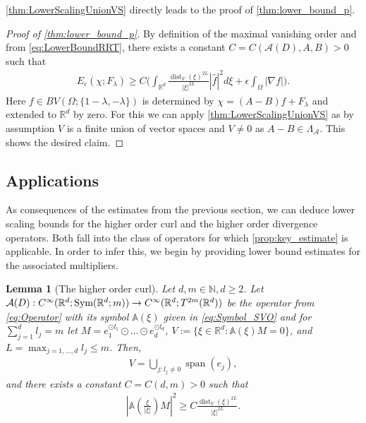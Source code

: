 \documentclass[a4paper, 10pt, twoside, notitlepage]{amsart}
\theoremstyle{plain}
\newtheorem{lem}[prop]{Lemma}
\newcommand{\R}{\mathbb{R}}
\newcommand{\N}{\mathbb{N}}
\newcommand{\A}{\mathcal{A}}
\renewcommand{\AA}{\mathbb{A}}
\renewcommand{\S}[1]{\textup{Sym}(\R^d;#1)}
\DeclareMathOperator{\dist}{dist}
\DeclareMathOperator{\vspan}{span}
\begin{document}
  \cref{thm:LowerScalingUnionVS} directly leads to the proof of \cref{thm:lower_bound_p}.
  
                             
                              \begin{proof}[Proof of \cref{thm:lower_bound_p}]
                                By definition of the maximal vanishing order and from \cref{eq:LowerBoundRRT}, there exists a constant $C = C(\A(D),A,B)>0$ such that
                                \begin{align*}
                                  E_{\epsilon}(\chi;F_\lambda) \geq C \Big( \int_{\R^d} \frac{\dist_V(\xi)^{2L}}{|\xi|^{2L}} |\hat{f}|^2 d\xi + \epsilon \int_\Omega |\nabla f|\Big).
                                \end{align*}
                                Here $f \in BV(\Omega;\{1-\lambda,-\lambda\})$ is determined by $\chi = (A-B)f + F_\lambda$ and extended to $\R^d$ by zero.
                                For this we can apply \cref{thm:LowerScalingUnionVS} as by assumption $V$ is a finite union of vector spaces and $V \neq 0$ as $A-B \in \Lambda_\A$.
                                This shows the desired claim.
                              \end{proof}
                            


                  
		
		\subsection{Applications} 
		\label{sec:Applications} 
		As consequences of the estimates from the previous section, we can deduce lower scaling bounds for the higher order curl and the higher order divergence operators. Both fall into the class of operators for which \cref{prop:key_estimate} is applicable. In order to infer this, we begin by providing lower bound estimates for the associated multipliers.
                
		\begin{lem}[The higher order curl]
			\label{lem:LowerBoundMultipl}
			Let $d,m \in \N, d \geq 2$. Let $\A(D):C^\infty(\R^d; \allowbreak \S{m}) \to C^\infty(\R^d;T^{2m}(\R^d))$ be the operator from \cref{eq:Operator} with its symbol $\AA(\xi)$ given in \cref{eq:Symbol_SVO} and for $\sum_{j=1}^d l_j = m$ let $M = e_1^{\odot l_1} \odot \dots \odot e_d^{\odot l_d}$, $V := \{\xi \in \R^d: \AA(\xi)M = 0\} $, and $L = \max_{j=1,\dots,d} l_j  \leq m$.
			Then,
\begin{align}
\label{eq:zero_set}
V = \bigcup_{j: l_j \neq 0} \vspan(e_j),
\end{align}			
			and there exists a constant $C = C(d,m) > 0$ such that
			\begin{align}
			\label{eq:LowerSymbol1}
				|\AA(\frac{\xi}{|\xi|})M|^2 \geq C \frac{\dist_V(\xi)^{2L}}{|\xi|^{2L}}.
			\end{align}
		\end{lem}
		
\end{document}
